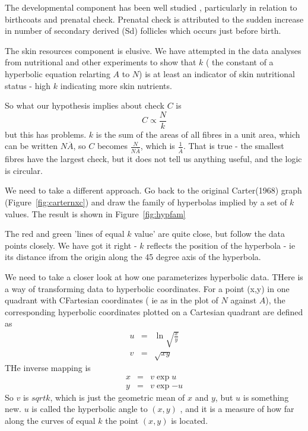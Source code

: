 \documentclass[titlepage]{article}  %
\begin{document}
The developmental component has been well studied , particularly in relation to birthcoats and prenatal check. Prenatal check is attributed to the sudden increase in number of secondary derived (Sd) follicles which occurs just before birth.

The skin resources component is elusive. We have attempted in the data analyses from nutritional and other experiments to show that $k$ ( the constant of a hyperbolic equation relarting $A$ to $N$)  is at least an indicator of skin nutritional status - high $k$ indicating more skin nutrients.

So what our hypothesis implies  about check $C$ is
\begin{displaymath}
C \propto \frac{N}{k}
\end{displaymath}
but this has problems. $k$ is the sum of the areas of all fibres in a unit area, which can be written $N \overline{A}$, so $C$ becomes $\frac{N}{N \overline{A}}$, which is $\frac{1}{\overline{A}}$. That is true - the smallest fibres have the largest check, but it does not tell us anything useful, and the logic is circular.

We need to take a different approach.  Go back to the original Carter(1968) graph (Figure~\ref{fig:carternxc}) and draw the family of hyperbolas implied by a set of $k$ values. The result is shown in Figure~\ref{fig:hypfam}

The red and green 'lines of equal $k$ value' are quite close, but follow the data points closely.  We have got it right - $k$ reflects the position of the hyperbola - ie its distance ifrom the origin along the 45 degree axis of the hyperbola.

We need to take a closer look at how one parameterizes hyperbolic data.  THere is a way of transforming data to hyperbolic coordinates. For a point (x,y) in one quadrant with CFartesian coordinates ( ie as in the plot of $N$ against $A$), the corresponding hyperbolic coordinates plotted on a Cartesian quadrant are defined as
\begin{eqnarray*}
u & = & \ln{\sqrt{\frac{x}{y}}} \\
v & = & \sqrt{xy}
\end{eqnarray*}
THe inverse mapping is 
\begin{eqnarray*}
x & = & v \exp{u} \\
y & = & v \exp{-u}
\end{eqnarray*}
So $v$ is $sqrt{k}$, which is just the geometric mean of $x$ and $y$, but $u$ is something new. $u$ is called the hyperbolic angle to $(x,y)$ , and it is a measure of how far along the curves of equal $k$ the point $(x,y)$ is located. 
\end{document}
